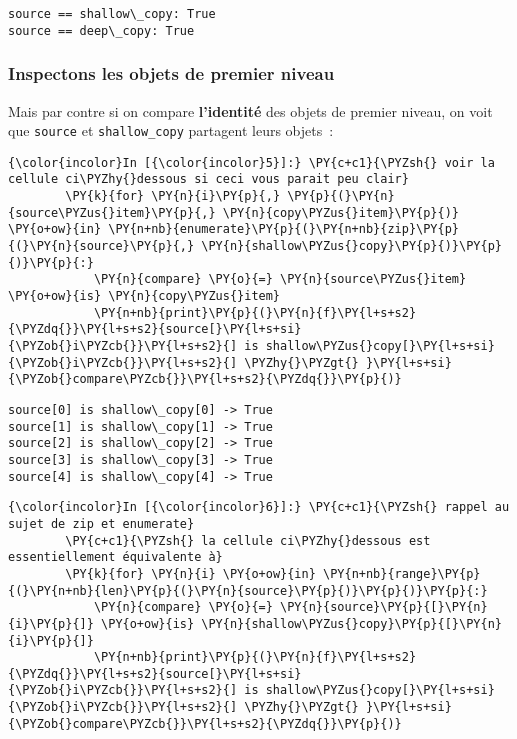     \begin{Verbatim}[commandchars=\\\{\}]
source == shallow\_copy: True
source == deep\_copy: True

    \end{Verbatim}

    \hypertarget{inspectons-les-objets-de-premier-niveau}{%
\subsubsection{Inspectons les objets de premier
niveau}\label{inspectons-les-objets-de-premier-niveau}}

    Mais par contre si on compare \textbf{l'identité} des objets de premier
niveau, on voit que \texttt{source} et \texttt{shallow\_copy} partagent
leurs objets~:

    \begin{Verbatim}[commandchars=\\\{\}]
{\color{incolor}In [{\color{incolor}5}]:} \PY{c+c1}{\PYZsh{} voir la cellule ci\PYZhy{}dessous si ceci vous parait peu clair}
        \PY{k}{for} \PY{n}{i}\PY{p}{,} \PY{p}{(}\PY{n}{source\PYZus{}item}\PY{p}{,} \PY{n}{copy\PYZus{}item}\PY{p}{)} \PY{o+ow}{in} \PY{n+nb}{enumerate}\PY{p}{(}\PY{n+nb}{zip}\PY{p}{(}\PY{n}{source}\PY{p}{,} \PY{n}{shallow\PYZus{}copy}\PY{p}{)}\PY{p}{)}\PY{p}{:}
            \PY{n}{compare} \PY{o}{=} \PY{n}{source\PYZus{}item} \PY{o+ow}{is} \PY{n}{copy\PYZus{}item}
            \PY{n+nb}{print}\PY{p}{(}\PY{n}{f}\PY{l+s+s2}{\PYZdq{}}\PY{l+s+s2}{source[}\PY{l+s+si}{\PYZob{}i\PYZcb{}}\PY{l+s+s2}{] is shallow\PYZus{}copy[}\PY{l+s+si}{\PYZob{}i\PYZcb{}}\PY{l+s+s2}{] \PYZhy{}\PYZgt{} }\PY{l+s+si}{\PYZob{}compare\PYZcb{}}\PY{l+s+s2}{\PYZdq{}}\PY{p}{)}
\end{Verbatim}


    \begin{Verbatim}[commandchars=\\\{\}]
source[0] is shallow\_copy[0] -> True
source[1] is shallow\_copy[1] -> True
source[2] is shallow\_copy[2] -> True
source[3] is shallow\_copy[3] -> True
source[4] is shallow\_copy[4] -> True

    \end{Verbatim}

    \begin{Verbatim}[commandchars=\\\{\}]
{\color{incolor}In [{\color{incolor}6}]:} \PY{c+c1}{\PYZsh{} rappel au sujet de zip et enumerate}
        \PY{c+c1}{\PYZsh{} la cellule ci\PYZhy{}dessous est essentiellement équivalente à}
        \PY{k}{for} \PY{n}{i} \PY{o+ow}{in} \PY{n+nb}{range}\PY{p}{(}\PY{n+nb}{len}\PY{p}{(}\PY{n}{source}\PY{p}{)}\PY{p}{)}\PY{p}{:}
            \PY{n}{compare} \PY{o}{=} \PY{n}{source}\PY{p}{[}\PY{n}{i}\PY{p}{]} \PY{o+ow}{is} \PY{n}{shallow\PYZus{}copy}\PY{p}{[}\PY{n}{i}\PY{p}{]}
            \PY{n+nb}{print}\PY{p}{(}\PY{n}{f}\PY{l+s+s2}{\PYZdq{}}\PY{l+s+s2}{source[}\PY{l+s+si}{\PYZob{}i\PYZcb{}}\PY{l+s+s2}{] is shallow\PYZus{}copy[}\PY{l+s+si}{\PYZob{}i\PYZcb{}}\PY{l+s+s2}{] \PYZhy{}\PYZgt{} }\PY{l+s+si}{\PYZob{}compare\PYZcb{}}\PY{l+s+s2}{\PYZdq{}}\PY{p}{)}
\end{Verbatim}



